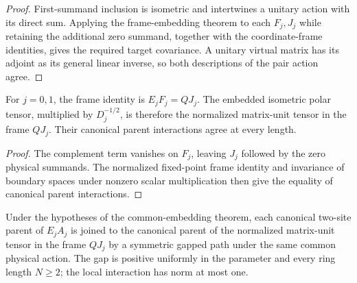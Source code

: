 \begin{proof}\leanok
    First-summand inclusion is isometric and intertwines a unitary
    action with its direct sum. Applying the frame-embedding theorem to
    each $F_j,J_j$ while retaining the additional zero summand, together
    with the coordinate-frame identities, gives the required target
    covariance.
    A unitary virtual matrix has its adjoint as its general linear
    inverse, so both descriptions of the pair action agree.
\end{proof}

\begin{lemma}
    \label{thm:spt_common_physical_polar_endpoints}
    \leanok
    For $j=0,1$, the frame identity is $E_jF_j=QJ_j$.
    The embedded isometric polar tensor, multiplied by $D_j^{-1/2}$,
    is therefore the normalized matrix-unit tensor in the frame $QJ_j$.
    Their canonical parent interactions agree at every length.
\end{lemma}

\begin{proof}\leanok
    The complement term vanishes on $F_j$, leaving $J_j$ followed by the
    zero physical summands.
    The normalized fixed-point frame identity and invariance of
    boundary spaces under nonzero scalar multiplication then give the
    equality of canonical parent interactions.
\end{proof}

\begin{definition}
    \label{def:spt_common_physical_polar_paths}
    \leanok
    Under the hypotheses of the common-embedding theorem, each
    canonical two-site parent of $E_jA_j$ is joined to the canonical
    parent of the normalized matrix-unit tensor in the frame $QJ_j$
    by a symmetric gapped path under the same common physical action.
    The gap is positive uniformly in the parameter and every ring
    length $N\ge2$; the local interaction has norm at most one.
\end{definition}

